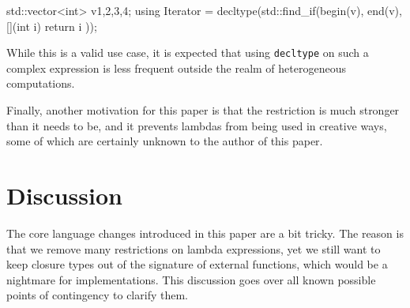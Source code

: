 \documentclass{wg21}
\newcommand{\cc}[1]{\texttt{#1}}
\begin{document}
\begin{cpp}
std::vector<int> v{1,2,3,4};
using Iterator = decltype(std::find_if(begin(v), end(v), [](int i) {
  return i %
}));
\end{cpp}

While this is a valid use case, it is expected that using \cc{decltype} on
such a complex expression is less frequent outside the realm of heterogeneous
computations.

Finally, another motivation for this paper is that the restriction is much stronger
than it needs to be, and it prevents lambdas from being used in creative ways,
some of which are certainly unknown to the author of this paper.


\section{Discussion}
The core language changes introduced in this paper are a bit tricky. The reason
is that we remove many restrictions on lambda expressions, yet we still want to
keep closure types out of the signature of external functions, which would be
a nightmare for implementations. This discussion goes over all known possible
points of contingency to clarify them.
\end{document}
